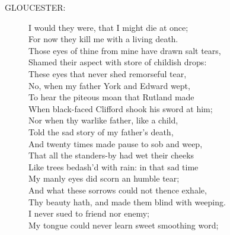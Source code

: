 \documentclass{article}
\begin{document}
\begin{description}
\item[GLOUCESTER:] 
\hspace{1pt}I would they were, that I might die at once;\\
\hspace{1pt}For now they kill me with a living death.\\
\hspace{1pt}Those eyes of thine from mine have drawn salt tears,\\
\hspace{1pt}Shamed their aspect with store of childish drops:\\
\hspace{1pt}These eyes that never shed remorseful tear,\\
\hspace{1pt}No, when my father York and Edward wept,\\
\hspace{1pt}To hear the piteous moan that Rutland made\\
\hspace{1pt}When black-faced Clifford shook his sword at him;\\
\hspace{1pt}Nor when thy warlike father, like a child,\\
\hspace{1pt}Told the sad story of my father's death,\\
\hspace{1pt}And twenty times made pause to sob and weep,\\
\hspace{1pt}That all the standers-by had wet their cheeks\\
\hspace{1pt}Like trees bedash'd with rain: in that sad time\\
\hspace{1pt}My manly eyes did scorn an humble tear;\\
\hspace{1pt}And what these sorrows could not thence exhale,\\
\hspace{1pt}Thy beauty hath, and made them blind with weeping.\\
\hspace{1pt}I never sued to friend nor enemy;\\
\hspace{1pt}My tongue could never learn sweet smoothing word;\\

\end{description}
\end{document}

